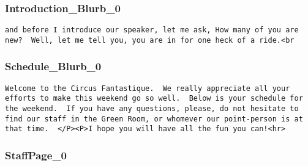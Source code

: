 \documentclass[tablesignature]{scrartcl}
\begin{document}
\subsubsection{Introduction\_{}Blurb\_{}0}
\label{sec-3_5_2}

\begin{verbatim}
and before I introduce our speaker, let me ask, How many of you are
new?  Well, let me tell you, you are in for one heck of a ride.<br
\end{verbatim}
\subsubsection{Schedule\_{}Blurb\_{}0}
\label{sec-3_5_3}

\begin{verbatim}
Welcome to the Circus Fantastique.  We really appreciate all your
efforts to make this weekend go so well.  Below is your schedule for
the weekend.  If you have any questions, please, do not hesitate to
find our staff in the Green Room, or whomever our point-person is at
that time.  </P><P>I hope you will have all the fun you can!<hr>
\end{verbatim}
\subsubsection{StaffPage\_{}0}
\label{sec-3_5_4}
\end{document}
